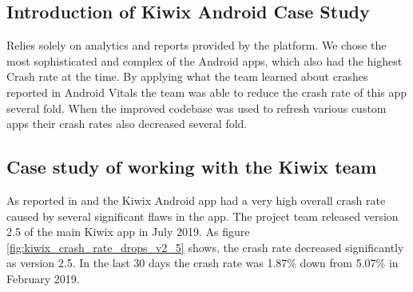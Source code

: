 \subsection{Introduction of Kiwix Android Case Study}

Relies solely on analytics and reports provided by the platform. We chose the most sophisticated and complex of the Android apps, which also had the highest Crash rate at the time. By applying what the team learned about crashes reported in Android Vitals the team was able to reduce the crash rate of this app several fold. When the improved codebase was used to refresh various custom apps their crash rates also decreased several fold.


\subsection{Case study of working with the Kiwix team}
As reported in \cite{harty_google_play_console_insightful_development_using_android_vitals_and_pre_launch_reports} and \cite{harty_better_android_apps_using_android_vitals} the Kiwix Android app had a very high overall crash rate caused by several significant flaws in the app. The project team released version 2.5 of the main Kiwix app in July 2019. As figure \ref{fig:kiwix_crash_rate_drops_v2_5} shows, the crash rate decreased significantly as version 2.5. In the last 30 days the crash rate was 1.87\% down from 5.07\% in February 2019.

